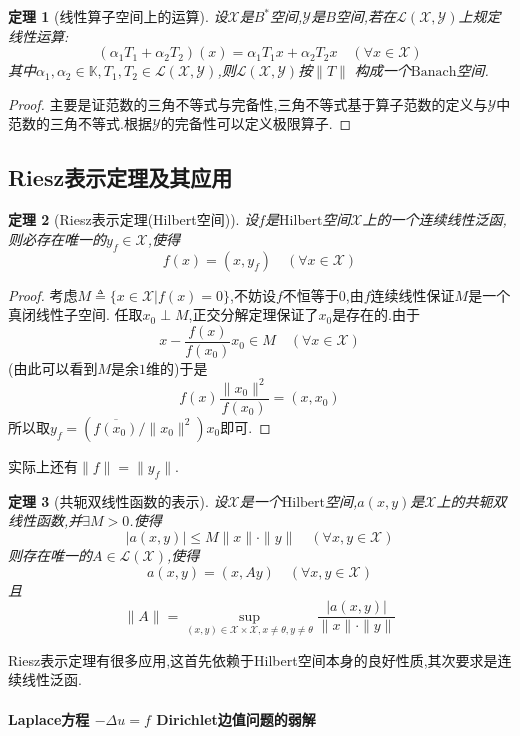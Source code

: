 \documentclass[12pt,a4paper]{article}
\newtheorem{thm}{定理}[subsection]  %
\begin{document}
\begin{thm}[线性算子空间上的运算]
    设$\mathscr{X}$是$B^*$空间,$\mathscr{Y}$是$B$空间,若在$\mathscr{L}(\mathscr{X},\mathscr{Y})$上规定线性运算:
    \[(\alpha_1 T_1 + \alpha_2 T_2)(x) = \alpha_1 T_1 x + \alpha_2 T_2 x \quad (\forall x \in \mathscr{X}) \]
    其中$\alpha_1,\alpha_2\in \mathbb{K},T_1,T_2\in\mathscr{L}(\mathscr{X},\mathscr{Y})$,则$\mathscr{L}(\mathscr{X},\mathscr{Y})$按$\|T\|$
    构成一个$\mathrm{Banach}$空间.
\end{thm}
\begin{proof}
    主要是证范数的三角不等式与完备性,三角不等式基于算子范数的定义与$\mathscr{Y}$中范数的三角不等式.根据$\mathscr{Y}$的完备性可以定义极限算子.
\end{proof}

\subsection{Riesz表示定理及其应用}
\begin{thm}[Riesz表示定理(Hilbert空间)]
    设$f$是$\mathrm{Hilbert}$空间$\mathscr{X}$上的一个连续线性泛函,则必存在唯一的$y_f \in \mathscr{X}$,使得
    \[f(x) = (x,y_f)\quad (\forall x \in \mathscr{X})\]
\end{thm}
\begin{proof}
    考虑$M\triangleq \{x\in \mathscr{X}|f(x) = 0\}$,不妨设$f$不恒等于$0$,由$f$连续线性保证$M$是一个真闭线性子空间.
    任取$x_0 \perp M$,正交分解定理保证了$x_0$是存在的.由于\[x-\frac{f(x)}{f(x_0)}x_0 \in M \quad (\forall x \in \mathscr{X})\]
    (由此可以看到$M$是余$1$维的)于是\[f(x)\frac{\|x_0\|^2}{f(x_0)} = (x,x_0)\]所以取$y_f = (\overline{f(x_0)}/\|x_0\|^2) x_0$即可.
\end{proof}
实际上还有$\|f\| = \|y_f\|$.
\begin{thm}[共轭双线性函数的表示]
    设$\mathscr{X}$是一个$\mathrm{Hilbert}$空间,$a(x,y)$是$\mathscr{X}$上的共轭双线性函数,并$\exists M>0$.使得
    \[|a(x,y)| \leq M\|x\|\cdot \|y\|\quad (\forall x,y \in \mathscr{X})\]
    则存在唯一的$A \in \mathscr{L}(\mathscr{X})$,使得\[a(x,y) = (x,Ay) \quad (\forall x,y \in \mathscr{X})\]
    且\[\|A\| = \underset{(x,y) \in \mathscr{X}\times \mathscr{X}, x \neq \theta, y \neq \theta}{\sup}\frac{|a(x,y)|}{\|x\|\cdot \|y\|} \]
\end{thm}
Riesz表示定理有很多应用,这首先依赖于\rm{Hilbert}空间本身的良好性质,其次要求是连续线性泛函.

\paragraph{Laplace方程 $-\Delta u = f$ Dirichlet边值问题的弱解}\mbox{} 
\end{document}
